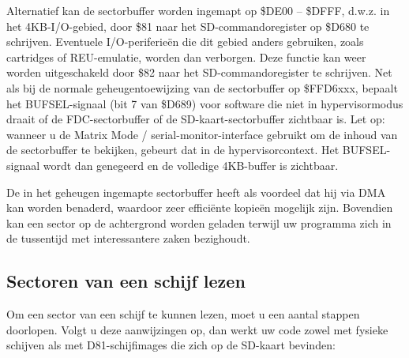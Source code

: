 Alternatief kan de sectorbuffer worden ingemapt op \$DE00 -- \$DFFF, d.w.z. in het 4KB-I/O-gebied, door \$81 naar het SD-commandoregister op \$D680 te schrijven. Eventuele I/O-periferieën die dit gebied anders gebruiken, zoals cartridges of REU-emulatie, worden dan verborgen. Deze functie kan weer worden uitgeschakeld door \$82 naar het SD-commandoregister te schrijven. Net als bij de normale geheugentoewijzing van de sectorbuffer op \$FFD6xxx, bepaalt het BUFSEL-signaal (bit 7 van \$D689) voor software die niet in hypervisormodus draait of de FDC-sectorbuffer of de SD-kaart-sectorbuffer zichtbaar is. Let op: wanneer u de Matrix Mode / serial-monitor-interface gebruikt om de inhoud van de sectorbuffer te bekijken, gebeurt dat in de hypervisorcontext. Het BUFSEL-signaal wordt dan genegeerd en de volledige 4KB-buffer is zichtbaar.

De in het geheugen ingemapte sectorbuffer heeft als voordeel dat hij via DMA kan worden benaderd, waardoor zeer efficiënte kopieën mogelijk zijn. Bovendien kan een sector op de achtergrond worden geladen terwijl uw programma zich in de tussentijd met interessantere zaken bezighoudt.

\subsection{Sectoren van een schijf lezen}

Om een sector van een schijf te kunnen lezen, moet u een aantal stappen doorlopen. Volgt u deze aanwijzingen op, dan werkt uw code zowel met fysieke schijven als met D81-schijfimages die zich op de SD-kaart bevinden:

